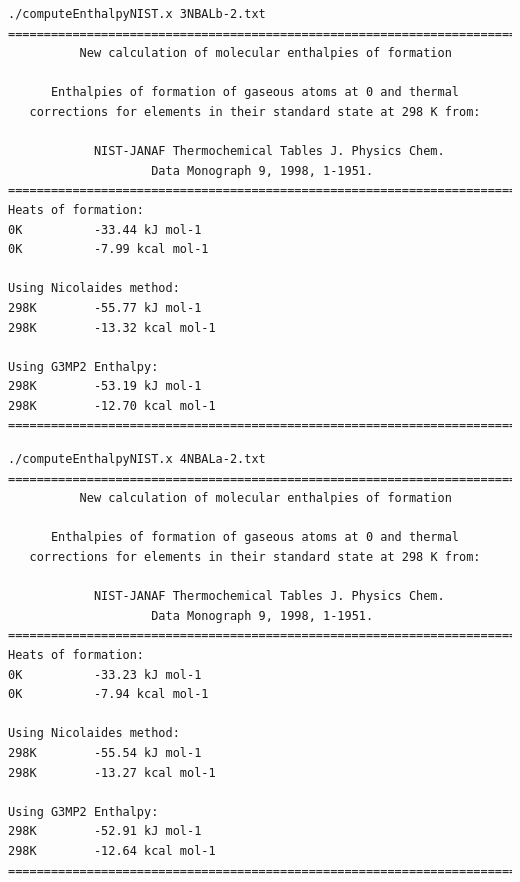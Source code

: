 \begin{lstlisting}[caption = Output de 3NBALb-2.txt en EnthalpyNIST]
./computeEnthalpyNIST.x 3NBALb-2.txt
========================================================================
          New calculation of molecular enthalpies of formation

      Enthalpies of formation of gaseous atoms at 0 and thermal 
   corrections for elements in their standard state at 298 K from:

            NIST-JANAF Thermochemical Tables J. Physics Chem. 
                    Data Monograph 9, 1998, 1-1951.
========================================================================
Heats of formation:
0K          -33.44 kJ mol-1
0K          -7.99 kcal mol-1

Using Nicolaides method:
298K        -55.77 kJ mol-1
298K        -13.32 kcal mol-1

Using G3MP2 Enthalpy:
298K        -53.19 kJ mol-1
298K        -12.70 kcal mol-1
========================================================================
\end{lstlisting}

\newpage

\begin{lstlisting}[caption = Output de 4NBALa-2.txt en EnthalpyNIST]
./computeEnthalpyNIST.x 4NBALa-2.txt
========================================================================
          New calculation of molecular enthalpies of formation

      Enthalpies of formation of gaseous atoms at 0 and thermal 
   corrections for elements in their standard state at 298 K from:

            NIST-JANAF Thermochemical Tables J. Physics Chem. 
                    Data Monograph 9, 1998, 1-1951.
========================================================================
Heats of formation:
0K          -33.23 kJ mol-1
0K          -7.94 kcal mol-1

Using Nicolaides method:
298K        -55.54 kJ mol-1
298K        -13.27 kcal mol-1

Using G3MP2 Enthalpy:
298K        -52.91 kJ mol-1
298K        -12.64 kcal mol-1
========================================================================
\end{lstlisting}


\newpage

